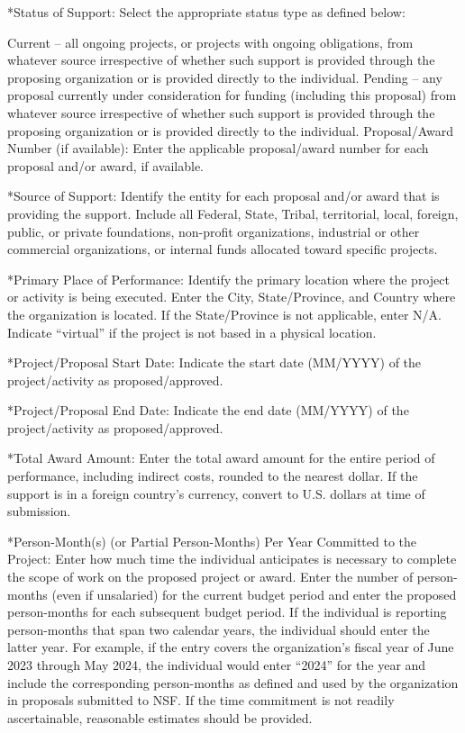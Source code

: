 {*Status of Support: Select the appropriate status type as defined below:

Current – all ongoing projects, or projects with ongoing obligations, from whatever source irrespective of whether such support is provided through the proposing organization or is provided directly to the individual.
Pending – any proposal currently under consideration for funding (including this proposal) from whatever source irrespective of whether such support is provided through the proposing organization or is provided directly to the individual.
Proposal/Award Number (if available): Enter the applicable proposal/award number for each proposal and/or award, if available.

*Source of Support: Identify the entity for each proposal and/or award that is providing the support. Include all Federal, State, Tribal, territorial, local, foreign, public, or private foundations, non-profit organizations, industrial or other commercial organizations, or internal funds allocated toward specific projects.

*Primary Place of Performance: Identify the primary location where the project or activity is being executed. Enter the City, State/Province, and Country where the organization is located. If the State/Province is not applicable, enter N/A. Indicate “virtual” if the project is not based in a physical location.

*Project/Proposal Start Date: Indicate the start date (MM/YYYY) of the project/activity as proposed/approved.

*Project/Proposal End Date: Indicate the end date (MM/YYYY) of the project/activity as proposed/approved.

*Total Award Amount: Enter the total award amount for the entire period of performance, including indirect costs, rounded to the nearest dollar. If the support is in a foreign country’s currency, convert to U.S. dollars at time of submission.

*Person-Month(s) (or Partial Person-Months) Per Year Committed to the Project: Enter how much time the individual anticipates is necessary to complete the scope of work on the proposed project or award. Enter the number of person-months (even if unsalaried) for the current budget period and enter the proposed person-months for each subsequent budget period. If the individual is reporting person-months that span two calendar years, the individual should enter the latter year. For example, if the entry covers the organization’s fiscal year of June 2023 through May 2024, the individual would enter “2024” for the year and include the corresponding person-months as defined and used by the organization in proposals submitted to NSF. If the time commitment is not readily ascertainable, reasonable estimates should be provided.

}

